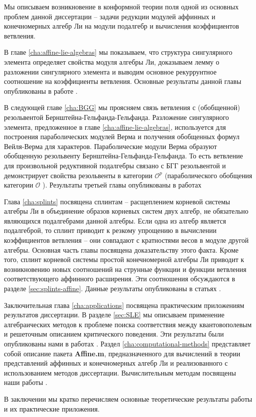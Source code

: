 Мы описываем возникновение в конформной теории поля одной из основных проблем данной диссертации -- задачи редукции модулей аффинных и конечномерных алгебр Ли на модули подалгебр и вычисления коэффициентов ветвления. 

В главе \ref{cha:affine-lie-algebras} мы показываем, что структура сингулярного элемента определяет свойства модуля алгебры Ли, доказываем лемму о разложении сингулярного элемента и выводим основное рекуррунтное соотношение на коэффициенты ветвления. Основные результаты данной главы опубликованы в работе . 

В следующей главе \ref{cha:BGG} мы проясняем связь ветвления с (обобщенной) резольвентой Бернштейна-Гельфанда-Гельфанда. Разложение сингулярного элемента, предложенное в главе \ref{cha:affine-lie-algebras}, используется для построения параболических модулей Верма и получения обобщенных формул Вейля-Верма для характеров. Параболические модули Верма образуют обобщенную резольвенту Бернштейна-Гельфанда-Гельфанда. То есть ветвление для произвольной редуктивной подалгебры связано с БГГ резольвентой и демонстрирует свойства резольвенты в категории $\mathcal{O}^{p}$ \cite{lepowsky1977generalization} (параболического обобщения категории $\mathcal{O}$ \cite{bernstein1976category}). Результаты третьей главы опубликованы в работах 

Глава \ref{cha:splints} посвящена сплинтам -- расщеплением корневой системы алгебры Ли в объединение образов корневых систем двух алгебр, не обязательно являющихся подалгебрами данной алгебры. Если одна из алгебр является подалгеброй, то сплинт приводит к резкому упрощению в вычислении коэффициентов ветвления -- они совпадают с кратностями весов в модуле другой алгебры. Основная часть главы посвящена доказательству этого факта. Кроме того, сплинт корневой системы простой конечномерной алгебры Ли приводит к возникновению новых соотношений на струнные функции и функции ветвления соответствующего аффинного расширения. Эти соотношения обсуждаются в разделе \ref{sec:splints-affine}. Данные результаты опубликованы в статьях .

Заключительная глава \ref{cha:applications} посвящена практическим приложениям результатов диссертации. В разделе \ref{sec:SLE} мы  описываем применение алгебраических методов к проблеме поиска соответствия между квантовополевым и решеточным описанием критического поведения. Эти результаты были опубликованы нами в работах . Раздел \ref{cha:computational-methods} представляет собой описание пакета {\bf Affine.m}, предназначенного для вычислений в теории представлений аффинных и конечномерных алгебр Ли и реализованного с использованием методов диссертации. Вычислительным методам посвящены наши работы .

В заключении мы кратко перечисляем основные теоретические результаты работы и их практические приложения.
